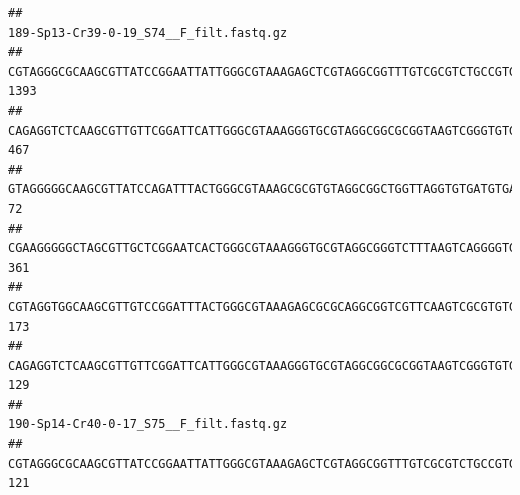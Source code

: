 \documentclass[]{article}
\begin{document}
\begin{verbatim}
##                                                                                                                                                                                                                                                           189-Sp13-Cr39-0-19_S74__F_filt.fastq.gz
## CGTAGGGCGCAAGCGTTATCCGGAATTATTGGGCGTAAAGAGCTCGTAGGCGGTTTGTCGCGTCTGCCGTGAAAGTCCGGGGCTCAACTCCGGATCTGCGGTGGGTACGGGCAGACTAGAGTGATGTAGGGGAGACTGGAATTCCTGGTGTAGCGGTGAAATGCGCAGATATCAGGAGGAACACCGATGGCGAAGGCAGGTCTCTGGGCATTAACTGACGCTGAGGAGCGAAAGCATGGGGAGCGAACA                                    1393
## CAGAGGTCTCAAGCGTTGTTCGGATTCATTGGGCGTAAAGGGTGCGTAGGCGGCGCGGTAAGTCGGGTGTGAAATCTCGGAGCTTAACTCCGAAACTGCATTCGATACTGCCGTGCTTGAGGACTGGAGAGGAGACTGGAATTTACGGTGTAGCGGTGAAATGCGTAGATATCGTAAGGAAGACCAGTGGCGAAGGCGGGTCTCTGGACAGTTCCTGACGCTGAGGCACGAAGGCCAGGGGAGCAAACG                                     467
## GTAGGGGGCAAGCGTTATCCAGATTTACTGGGCGTAAAGCGCGTGTAGGCGGCTGGTTAGGTGTGATGTGAAATCTTCCGGCTCAACCGGAAAACTGCATTGCAAACCGGCCTGGCTAGAGTGCAGGAGAGGGAAGCGGAATTCCAGGTGTAGCGGTGAAATGCGTAGATATCTGGAGGAACACCAGTGGCGAAGGCGGCTTCCTGGCCTGCAACTGACGCTGAGACGCGAAAGCGTGGGGAGCGAAC                                       72
## CGAAGGGGGCTAGCGTTGCTCGGAATCACTGGGCGTAAAGGGTGCGTAGGCGGGTCTTTAAGTCAGGGGTGAAATCCTGGAGCTCAACTCCAGAACTGCCTTTGATACTGAAGATCTTGAGTTCGGGAGAGGTGAGTGGAACTGCGAGTGTAGAGGTGAAATTCGTAGATATTCGCAAGAACACCAGTGGCGAAGGCGGCTCACTGGCCCGATACTGACGCTGAGGCACGAAAGCGTGGGGAGCAAACA                                     361
## CGTAGGTGGCAAGCGTTGTCCGGATTTACTGGGCGTAAAGAGCGCGCAGGCGGTCGTTCAAGTCGCGTGTGAAAGCCCCCGGCTCAACTGGGGAGGGTCACGCGATACTGATCGACTCGAAGGCAGGAGAGGGTAGTGGAATTCCCGGTGTAGTGGTGAAATGCGTAGATATCGGGAGGAACACCAGTGGCGAAGGCGACTACCTGGCCTGTTCTTGACGCTGAGGCGCGAAAGCTAGGGGAGCAAACG                                     173
## CAGAGGTCTCAAGCGTTGTTCGGATTCATTGGGCGTAAAGGGTGCGTAGGCGGCGCGGTAAGTCGGGTGTGAAATCTCGGGGCTTAACTCCGAAACTGCATTCGATACTGCCGTGCTTGAGGACTGGAGAGGAGACTGGAATTTACGGTGTAGCGGTGAAATGCGTAGATATCGTAAGGAAGACCAGTGGCGAAGGCGGGTCTCTGGACAGTTCCTGACGCTGAGGCACGAAGGCCAGGGGAGCAAACG                                     129
##                                                                                                                                                                                                                                                           190-Sp14-Cr40-0-17_S75__F_filt.fastq.gz
## CGTAGGGCGCAAGCGTTATCCGGAATTATTGGGCGTAAAGAGCTCGTAGGCGGTTTGTCGCGTCTGCCGTGAAAGTCCGGGGCTCAACTCCGGATCTGCGGTGGGTACGGGCAGACTAGAGTGATGTAGGGGAGACTGGAATTCCTGGTGTAGCGGTGAAATGCGCAGATATCAGGAGGAACACCGATGGCGAAGGCAGGTCTCTGGGCATTAACTGACGCTGAGGAGCGAAAGCATGGGGAGCGAACA                                     121

\end{verbatim}
\end{document}
